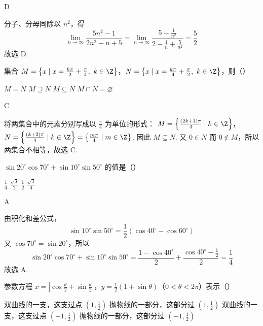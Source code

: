 \begin{answer}
D
\end{answer}

\begin{solution}
分子、分母同除以 \(n^2\)，得
\[
\lim_{n\to\infty}\frac{5n^2-1}{2n^2-n+5}
=\lim_{n\to\infty}\frac{5-\frac1{n^2}}{2-\frac1n+\frac5{n^2}}
=\frac52
\]
故选 D.
\end{solution}

\begin{problem}
集合 \(M=\left\{x\mid x=\frac{k\pi}{2}+\frac{\pi}{4},\ k\in\Z\right\}\)，\(N=\left\{x\mid x=\frac{k\pi}{4}+\frac{\pi}{2},\ k\in\Z\right\}\)，则（\quad）

\choices
    {\(M=N\)}
    {\(M\supseteq N\)}
    {\(M\subseteq N\)}
    {\(M\cap N=\varnothing\)}
\end{problem}

\begin{answer}
C
\end{answer}

\begin{solution}
将两集合中的元素分别写成以 \(\frac\pi4\) 为单位的形式：
\(M=\left\{\frac{(2k+1)\pi}{4}\mid k\in\Z\right\}\)，\(N=\left\{\frac{(k+2)\pi}{4}\mid k\in\Z\right\} =\left\{\frac{m\pi}{4}\mid m\in\Z\right\}\).
因此 \(M\subseteq N\). 又 \(0\in N\) 而 \(0\notin M\)，所以两集合不相等，故选 C.
\end{solution}

\begin{problem}
\(\sin 20^\circ\cos 70^\circ+\sin 10^\circ\sin 50^\circ\) 的值是（\quad）

\choices
    {\(\frac{1}{4}\)}
    {\(\frac{\sqrt{3}}{2}\)}
    {\(\frac{1}{2}\)}
    {\(\frac{\sqrt{3}}{4}\)}
\end{problem}

\begin{answer}
A
\end{answer}

\begin{solution}
由积化和差公式，
\[
\sin10^\circ\sin50^\circ
=\frac12\left(\cos40^\circ-\cos60^\circ\right)
\]
又 \(\cos70^\circ=\sin20^\circ\)，所以
\[
\sin20^\circ\cos70^\circ+\sin10^\circ\sin50^\circ
=\frac{1-\cos40^\circ}{2}
+\frac{\cos40^\circ-\frac12}{2}
=\frac14
\]
故选 A.
\end{solution}

\begin{problem}
参数方程 \(x=\left|\cos\frac{\theta}{2}+\sin\frac{\theta}{2}\right|\)，\(y=\frac{1}{2}(1+\sin\theta)\)（\(0<\theta<2\pi\)）表示（\quad）

\choices
    {双曲线的一支，这支过点 \(\left(1,\frac{1}{2}\right)\)}
    {抛物线的一部分，这部分过 \(\left(1,\frac{1}{2}\right)\)}
    {双曲线的一支，这支过点 \(\left(-1,\frac{1}{2}\right)\)}
    {抛物线的一部分，这部分过 \(\left(-1,\frac{1}{2}\right)\)}
\end{problem}

